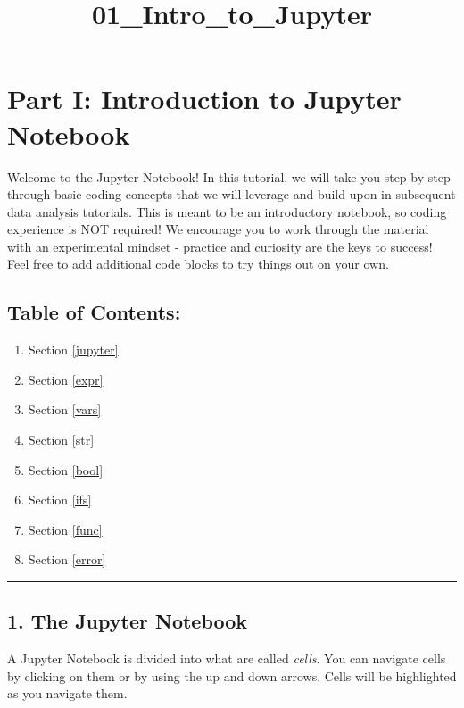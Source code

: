 \documentclass[11pt]{article}
\title{01\_Intro\_to\_Jupyter}
\providecommand{\tightlist}{%
      \setlength{\itemsep}{0pt}\setlength{\parskip}{0pt}}
\begin{document}
    
    
    \maketitle
    
    

    
    \section{Part I: Introduction to Jupyter
Notebook}\label{part-i-introduction-to-jupyter-notebook}

Welcome to the Jupyter Notebook! In this tutorial, we will take you
step-by-step through basic coding concepts that we will leverage and
build upon in subsequent data analysis tutorials. This is meant to be an
introductory notebook, so coding experience is NOT required! We
encourage you to work through the material with an experimental mindset
- practice and curiosity are the keys to success! Feel free to add
additional code blocks to try things out on your own.

\subsection{Table of Contents:}\label{table-of-contents}

\begin{enumerate}
\def\labelenumi{\arabic{enumi}.}
\tightlist
\item
  Section \ref{jupyter}
\item
  Section \ref{expr}
\item
  Section \ref{vars}
\item
  Section \ref{str}
\item
  Section \ref{bool}
\item
  Section \ref{ifs}
\item
  Section \ref{func}
\item
  Section \ref{error}
\end{enumerate}

\begin{center}\rule{0.5\linewidth}{\linethickness}\end{center}

    \subsection{1. The Jupyter Notebook}\label{the-jupyter-notebook}

A Jupyter Notebook is divided into what are called \emph{cells}. You can
navigate cells by clicking on them or by using the up and down arrows.
Cells will be highlighted as you navigate them.
\end{document}
